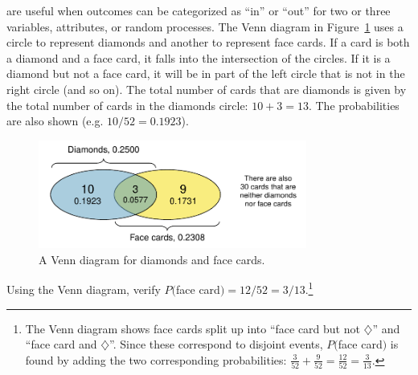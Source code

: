  are useful when outcomes can be categorized as ``in'' or ``out'' for two or three variables, attributes, or random processes. The Venn diagram in Figure~\ref{venn} uses a circle to represent diamonds and another to represent face cards. If a card is both a diamond and a face card, it falls into the intersection of the circles. If it is a diamond but not a face card, it will be in part of the left circle that is not in the right circle (and so on). The total number of cards that are diamonds is given by the total number of cards in the diamonds circle: $10+3=13$. The probabilities are also shown (e.g. $10/52 = 0.1923$).

\begin{figure}
\centering
\includegraphics[height=1.4in]{ch_probability/figures/venn/venn}
\caption{A Venn diagram for diamonds and face cards.}
\label{venn}
\end{figure}

\textPE{\pagebreak}

\begin{exercise}
Using the Venn diagram, verify $P($face card$) = 12/52=3/13$.\footnote{The Venn diagram shows face cards split up into ``face card but not {\color{redcards}$\diamondsuit$}'' and ``face card and {\color{redcards}$\diamondsuit$}''. Since these correspond to disjoint events, $P($face card$)$ is found by adding the two corresponding probabilities: $\frac{3}{52} + \frac{9}{52} = \frac{12}{52} = \frac{3}{13}$.}
\end{exercise}


